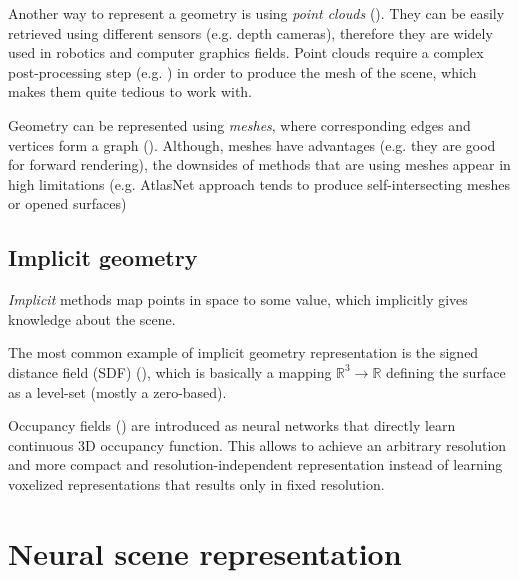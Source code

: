 Another way to represent a geometry is using \textit{point clouds} (\cite{qi2017pointnet, fan2016point}).
They can be easily retrieved using different sensors (e.g. depth cameras),
therefore they are widely used in robotics and computer graphics fields.
Point clouds require a complex post-processing step
(e.g. \cite{ballpivoting1999bernardini}) in order to produce the mesh of the scene,
which makes them quite tedious to work with.

Geometry can be represented using \textit{meshes},
where corresponding edges and vertices form a graph (\cite{wang20183d}).
Although, meshes have advantages (e.g. they are good for forward rendering),
the downsides of methods that are using meshes appear in high limitations
(e.g. AtlasNet approach \cite{groueix2018atlasnet} tends to produce self-intersecting meshes or opened surfaces)

\subsection{Implicit geometry}

\textit{Implicit} methods map points in space to some value,
which implicitly gives knowledge about the scene.

The most common example of implicit geometry representation is the signed distance field (SDF) (\cite{truncdistfield1996curless, Lombardi_2019}),
which is basically a mapping $\mathbb{R}^3 \xrightarrow{} \mathbb{R}$ defining the surface as a level-set (mostly a zero-based).

Occupancy fields (\cite{occupancy2019mescheder}) are introduced as neural networks
that directly learn continuous 3D occupancy function.
This allows to achieve an arbitrary resolution and more compact and resolution-independent representation
instead of learning voxelized representations
that results only in fixed resolution.






\section{Neural scene representation}

